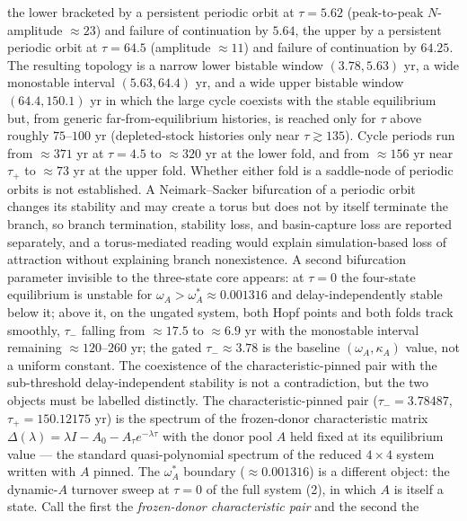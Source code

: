 \documentclass[11pt]{article}
\begin{document}
the lower bracketed by a persistent periodic orbit at \(\tau = 5.62\)
(peak-to-peak \(N\)-amplitude \(\approx23\)) and failure of continuation
by \(5.64\), the upper by a persistent periodic orbit at \(\tau = 64.5\)
(amplitude \(\approx11\)) and failure of continuation by \(64.25\). The
resulting topology is a narrow lower bistable window \((3.78, 5.63)\)
yr, a wide monostable interval \((5.63, 64.4)\) yr, and a wide upper
bistable window \((64.4, 150.1)\) yr in which the large cycle coexists
with the stable equilibrium but, from generic far-from-equilibrium
histories, is reached only for \(\tau\) above roughly \(75\)--\(100\) yr
(depleted-stock histories only near \(\tau \gtrsim 135\)). Cycle periods
run from \(\approx371\) yr at \(\tau = 4.5\) to \(\approx320\) yr at the
lower fold, and from \(\approx156\) yr near \(\tau_+\) to \(\approx73\)
yr at the upper fold. Whether either fold is a saddle-node of periodic
orbits is not established. A Neimark--Sacker bifurcation of a periodic
orbit changes its stability and may create a torus but does not by
itself terminate the branch, so branch termination, stability loss, and
basin-capture loss are reported separately, and a torus-mediated reading
would explain simulation-based loss of attraction without explaining
branch nonexistence. A second bifurcation parameter invisible to the
three-state core appears: at \(\tau = 0\) the four-state equilibrium is
unstable for \(\omega_A > \omega_A^* \approx 0.001316\) and
delay-independently stable below it; above it, on the ungated system,
both Hopf points and both folds track smoothly, \(\tau_-\) falling from
\(\approx17.5\) to \(\approx6.9\) yr with the monostable interval
remaining \(\approx120\)--\(260\) yr; the gated \(\tau_- \approx 3.78\)
is the baseline \((\omega_A, \kappa_A)\) value, not a uniform constant.
The coexistence of the characteristic-pinned pair with the sub-threshold
delay-independent stability is not a contradiction, but the two objects
must be labelled distinctly. The characteristic-pinned pair
(\(\tau_- = 3.78487\), \(\tau_+ = 150.12175\) yr) is the spectrum of the
frozen-donor characteristic matrix
\(\Delta(\lambda) = \lambda I - A_0 - A_\tau e^{-\lambda\tau}\) with the
donor pool \(A\) held fixed at its equilibrium value --- the standard
quasi-polynomial spectrum of the reduced \(4\times4\) system written
with \(A\) pinned. The \(\omega_A^*\) boundary (\(\approx 0.001316\)) is
a different object: the dynamic-\(A\) turnover sweep at \(\tau = 0\) of
the full system (2), in which \(A\) is itself a state. Call the first
the \emph{frozen-donor characteristic pair} and the second the
\end{document}
